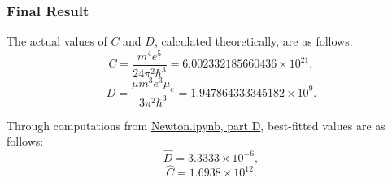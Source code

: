 \documentclass[12pt]{article}
\begin{document}
\subsubsection{Final Result}

The actual values of \(C\) and \(D\), calculated theoretically, are as follows:
\[
C = \frac{m^4 e^5}{24\pi^2 \hbar^3} = 6.002332185660436 \times 10^{21},
\]
\[
D = \frac{\mu m^3 e^3 \mu_e}{3\pi^2 \hbar^3} = 1.947864333345182 \times 10^{9}.
\]

Through computations from \href{Newton.ipynb}{Newton.ipynb, part D}, best-fitted values are as follows:
\[
\hat{D} = 3.3333 \times 10^{-6},
\]
\[
\hat{C} = 1.6938 \times 10^{12}.
\]
\end{document}
